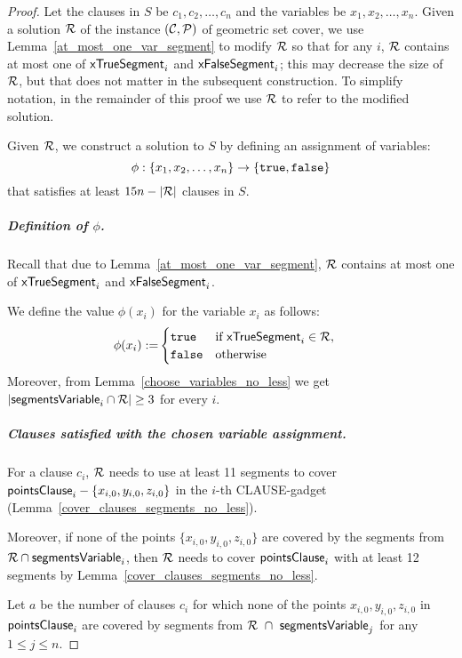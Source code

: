 \begin{proof}\leavevmode
Let the clauses in $S$ be $c_1,c_2,\ldots,c_n$
and the variables be $x_1,x_2,\ldots,x_n$.
Given a solution $\mathcal{R}$
of the instance $(\mathcal{C}, \mathcal{P})$ of geometric set cover,
we use Lemma~\ref{at_most_one_var_segment} to modify $\mathcal{R}$
so that for any $i$, $\mathcal{R}$ contains at most
one of $\mathsf{xTrueSegment}_{i}$ and $\mathsf{xFalseSegment}_{i}$;
this may decrease the size of $\mathcal{R}$,
but that does not matter in the subsequent construction.
To simplify notation,
in the remainder of this proof we use $\mathcal{R}$ to refer to the modified solution.

Given $\mathcal{R}$, we construct a solution to $S$ by defining an
assignment of variables:
$$\phi : \{ x_1, x_2, \ldots, x_n\} \rightarrow \{\texttt{true}, \texttt{false}\}$$
that satisfies at least $15n-|\mathcal{R}|$ clauses in $S$.

\subparagraph{Definition of $\phi$.}
Recall that due to Lemma~\ref{at_most_one_var_segment},
$\mathcal{R}$ contains at most one of $\mathsf{xTrueSegment}_{i}$ and $\mathsf{xFalseSegment}_{i}$.

We define the value $\phi(x_i)$ for the variable $x_i$ as follows:
\begin{align}
	\begin{split}
	\label{eqn:variable_assignment}
	\phi(x_i) := & \begin{cases}
	\texttt{true} & \text{if}\ \mathsf{xTrueSegment}_{i} \in \mathcal{R}, \\
	\texttt{false} & \text{otherwise}
	\end{cases}
	\end{split}
\end{align}
Moreover, from Lemma~\ref{choose_variables_no_less} we get $|\mathsf{segmentsVariable}_{i} \cap \mathcal{R}| \ge 3$ for every $i$.

\subparagraph{Clauses satisfied with the chosen variable assignment.}

For a clause $c_i$,
$\mathcal{R}$ needs to use at least 11 segments to cover $\mathsf{pointsClause}_{i} - \{x_{i,0}, y_{i,0}, z_{i,0}\}$
in the $i$-th CLAUSE-gadget (Lemma~\ref{cover_clauses_segments_no_less}).

Moreover, if none of the points $\{x_{i,0}, y_{i,0}, z_{i,0}\}$
are covered by the segments from $\mathcal{R} \cap \mathsf{segmentsVariable}_{i}$,
then $\mathcal{R}$ needs to cover $\mathsf{pointsClause}_{i}$
with at least 12 segments
by Lemma~\ref{cover_clauses_segments_no_less}.

Let $a$ be the number of clauses $c_i$ for which none of
the points $x_{i,0}, y_{i,0}, z_{i,0}$ in $\mathsf{pointsClause}_{i}$ are covered by
segments from $\mathcal{R}~\cap~\mathsf{segmentsVariable}_{j}$ for any $1 \le j \le n$.


\end{proof}
